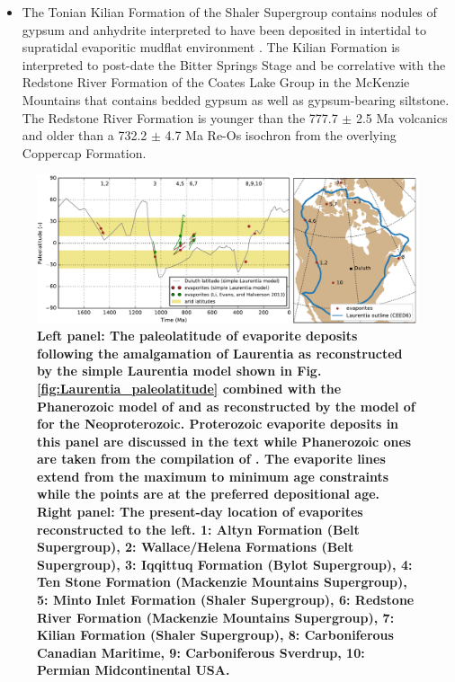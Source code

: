 \documentclass[11pt,letterpaper]{article}
\begin{document}
\begin{itemize}
\item The Tonian Kilian Formation of the Shaler Supergroup contains nodules of gypsum and anhydrite interpreted to have been deposited in intertidal to supratidal evaporitic mudflat environment \citep{Prince2014a}. The Kilian Formation is interpreted to post-date the Bitter Springs Stage and be correlative with the Redstone River Formation of the Coates Lake Group in the McKenzie Mountains that contains bedded gypsum as well as gypsum-bearing siltstone\citep{Jefferson1989a, Jones2010a}. The Redstone River Formation is younger than the 777.7 $\pm$ 2.5 Ma volcanics and older than a 732.2 $\pm$ 4.7 Ma Re-Os isochron from the overlying Coppercap Formation.
\end{itemize}

\begin{figure}
\centering
\includegraphics[width=\textwidth]{../Figures/Laurentia_evaporite_figure.pdf}
\caption{\small{\textbf{Left panel: The paleolatitude of evaporite deposits following the amalgamation of Laurentia as reconstructed by the simple Laurentia model shown in Fig. \ref{fig:Laurentia_paleolatitude} combined with the Phanerozoic model of \cite{Torsvik2017a} and as reconstructed by the model of \cite{Li2013a} for the Neoproterozoic. Proterozoic evaporite deposits in this panel are discussed in the text while Phanerozoic ones are taken from the compilation of \cite{Evans2006a}. The evaporite lines extend from the maximum to minimum age constraints while the points are at the preferred depositional age.  Right panel: The present-day location of evaporites reconstructed to the left. 1: Altyn Formation (Belt Supergroup), 2: Wallace/Helena Formations (Belt Supergroup), 3: Iqqittuq Formation (Bylot Supergroup), 4: Ten Stone Formation (Mackenzie Mountains Supergroup), 5: Minto Inlet Formation (Shaler Supergroup), 6: Redstone River Formation (Mackenzie Mountains Supergroup), 7: Kilian Formation (Shaler Supergroup), 8: Carboniferous Canadian Maritime, 9: Carboniferous Sverdrup, 10: Permian Midcontinental USA.}}}
\label{fig:Laurentia_evaporites}
\end{figure}
\end{document}
